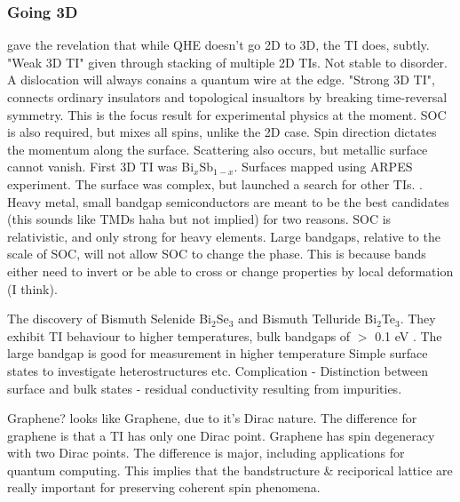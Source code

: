 \documentclass[../mattg_ti-fii_lit-review.tex]{subfiles}
\begin{document}
	\subsubsection{Going 3D}
	\begin{outline}
		 gave the revelation that while QHE doesn't go 2D to 3D, the TI does, subtly. \cite{fu_topological_2007, moore_topological_2007, roy_topological_2009}
		\1 "Weak 3D TI" given through stacking of multiple 2D TIs. Not stable to disorder. A dislocation will always conains a quantum wire at the edge.
		\1 "Strong 3D TI", connects ordinary insulators and topological insualtors by breaking time-reversal symmetry. \cite{moore_topological_2007} This is the focus result for experimental physics at the moment.
		\1 SOC is also required, but mixes all spins, unlike the 2D case. Spin direction dictates the momentum along the surface. Scattering also occurs, but metallic surface cannot vanish.
		\1 First 3D TI was Bi$_x$Sb$_{1-x}$. Surfaces mapped using ARPES experiment. The surface was complex, but launched a search for other TIs. \cite{hsieh_topological_2008,hsieh_observation_2009}.
		\1 Heavy metal, small bandgap semiconductors are meant to be the best candidates (this sounds like TMDs haha but not implied) for two reasons.
		\2 SOC is relativistic, and only strong for heavy elements.
		\2 Large bandgaps, relative to the scale of SOC, will not allow SOC to change the phase. This is because bands either need to invert or be able to cross or change properties by local deformation (I think).
		
		\1 The discovery of Bismuth Selenide Bi$_2$Se$_3$ and Bismuth Telluride Bi$_2$Te$_3$. They exhibit TI behaviour to higher temperatures, bulk bandgaps of $>$ 0.1 eV \cite{xia_observation_2009,zhang_topological_2009,chen_experimental_2009}.
		\2 The large bandgap is good for measurement in higher temperature
		\2 Simple surface states to investigate heterostructures etc. 
		\2 Complication - Distinction between surface and bulk states - residual conductivity resulting from impurities.
		
		\1 Graphene? \bismuthselinide{} looks like Graphene, due to it's Dirac nature. The difference for graphene is that a TI has only one Dirac point. Graphene has spin degeneracy with two Dirac points. The difference is major, including applications for quantum computing. This implies that the bandstructure \& reciporical lattice are really important for preserving coherent spin phenomena.
		

\end{outline}
\end{document}
